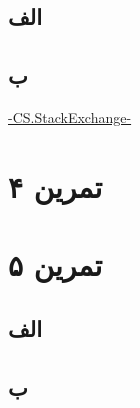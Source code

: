 \documentclass[]{article}
\begin{document}
\subsection*{\color{blue}{جواب}}
\subsection*{الف}

\subsection*{ب}

\begin{latin}
\href{https://cs.stackexchange.com/questions/85400/show-that-maximum-disjoint-set-problem-is-np-complete}{-CS.StackExchange-}
\end{latin}


\pagebreak
\section*{تمرین ۴}

\subsection*{\color{blue}{جواب}}


\pagebreak
\section*{تمرین ۵}

\subsection*{\color{blue}{جواب}}
\subsection*{الف}

\subsection*{ب}

\end{document}
